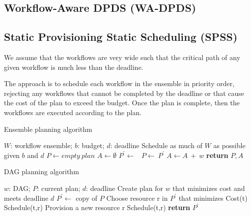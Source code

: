 \documentclass{sig-alternate}
\begin{document}
\subsection{Workflow-Aware DPDS (WA-DPDS)}

\subsection{Static Provisioning Static Scheduling (SPSS)}

We assume that the workflows are very wide such that the critical path of any given workflow is much less than the deadline.

The approach is to schedule each workflow in the ensemble in priority order, rejecting any workflows that cannot be completed by the deadline or that cause the cost of the plan to exceed the budget. Once the plan is complete, then the workflows are executed according to the plan.

\begin{algorithm}
\caption{Ensemble planning algorithm}
\label{alg:admit}
\begin{algorithmic}[1]
\Require $W$: workflow ensemble; $b$: budget; $d$: deadline
\Ensure Schedule as much of $W$ as possible given $b$ and $d$
    \State $P\gets empty\ plan$
    \State $A\gets \emptyset$ 
        \State $P^\prime \gets$\ 
                \State $P\gets\ P^\prime$ 
                \State $A \gets A\ +\ w$ 
            \EndIf
        \EndIf
    \EndFor
    \State \textbf{return} $P,A$
\EndProcedure
\end{algorithmic} 
\end{algorithm}


\begin{algorithm}
\caption{DAG planning algorithm}
\label{alg:plandag}
\begin{algorithmic}[1]
\Require $w$: DAG; $P$: current plan; $d$: deadline
\Ensure Create plan for $w$ that minimizes cost and meets deadline $d$
    \State $P^\prime\gets$ copy of $P$
    \State {}
        \State Choose resource r in $P^\prime$ that minimizes Cost(t)
            \State Schedule(t,r)
        \Else
            \State Provision a new resource r
            \State Schedule(t,r)
        \EndIf
    \EndFor
    \State \textbf{return} $P^\prime$
\EndProcedure
\end{algorithmic} 
\end{algorithm}
\end{document}
